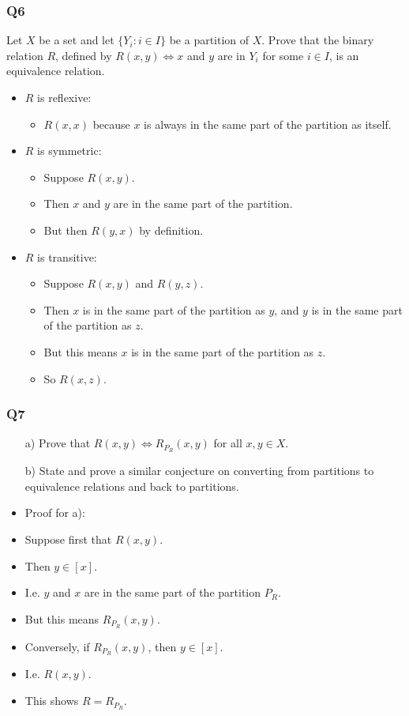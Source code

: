 \documentclass[handout]{beamer}
\begin{document}
\begin{frame}
\frametitle{Q6}
Let $X$ be a set and let $\{Y_i: i\in I\}$ be a partition of $X$. Prove that the binary relation $R$, defined by $R(x,y)\iff x$ and $y$ are in $Y_i$ for some $i\in I$, is an equivalence relation.
\begin{itemize}
\item $R$ is reflexive: 
\begin{itemize}
\item $R(x,x)$ because $x$ is always in the same part of the partition as itself.
\end{itemize}

\item $R$ is symmetric:
\begin{itemize} 
\item Suppose $R(x,y)$. 
\item Then $x$ and $y$ are in the same part of the partition. 
\item But then $R(y,x)$ by definition.
\end{itemize}

\item $R$ is transitive:
\begin{itemize} 
\item Suppose $R(x,y)$ and $R(y,z)$. 
\item Then $x$ is in the same part of the partition as $y$, and $y$ is in the same part of the partition as $z$. 
\item But this means $x$ is in the same part of the partition as $z$.
\item So $R(x,z)$.
\end{itemize}
\end{itemize}
\end{frame}

\begin{frame}
\frametitle{Q7}
\begin{enumerate}
\item[a)] Prove that $R(x,y)\iff R_{P_R}(x,y)$ for all $x,y\in X$. 
\item[b)] State and prove a similar conjecture on converting from partitions to equivalence relations and back to partitions.
\end{enumerate}
\begin{itemize}
\item Proof for a):
\item Suppose first that $R(x,y)$. 
\item Then $y\in[x]$. 
\item I.e. $y$ and $x$ are in the same part of the partition $P_R$. 
\item But this means $R_{P_R}(x,y)$. 
\item Conversely, if $R_{P_R}(x,y)$, then $y\in [x]$. 
\item I.e. $R(x,y)$. 
\item This shows $R = R_{P_R}$.
\end{itemize}
\end{frame}
\end{document}
